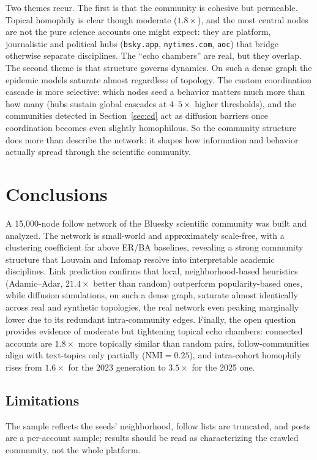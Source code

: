 Two themes recur. The first is that the community is cohesive but permeable. Topical homophily is clear though moderate ($1.8\times$), and the most central nodes are not the pure science accounts one might expect: they are platform, journalistic and political hubs (\texttt{bsky.app}, \texttt{nytimes.com}, \texttt{aoc}) that bridge otherwise separate disciplines. The ``echo chambers'' are real, but they overlap. The second theme is that structure governs dynamics. On such a dense graph the epidemic models saturate almost regardless of topology. The custom coordination cascade is more selective: which nodes seed a behavior matters much more than how many (hubs sustain global cascades at $4$--$5\times$ higher thresholds), and the communities detected in Section~\ref{sec:cd} act as diffusion barriers once coordination becomes even slightly homophilous. So the community structure does more than describe the network: it shapes how information and behavior actually spread through the scientific community.

\section{Conclusions}
A 15{,}000-node follow network of the Bluesky scientific community was built and analyzed. The network is small-world and approximately scale-free, with a clustering coefficient far above ER/BA baselines, revealing a strong community structure that Louvain and Infomap resolve into interpretable academic disciplines. Link prediction confirms that local, neighborhood-based heuristics (Adamic--Adar, $21.4\times$ better than random) outperform popularity-based ones, while diffusion simulations, on such a dense graph, saturate almost identically across real and synthetic topologies, the real network even peaking marginally lower due to its redundant intra-community edges. Finally, the open question provides evidence of moderate but tightening topical echo chambers: connected accounts are $1.8\times$ more topically similar than random pairs, follow-communities align with text-topics only partially ($\mathrm{NMI}=0.25$), and intra-cohort homophily rises from $1.6\times$ for the 2023 generation to $3.5\times$ for the 2025 one.

\subsection{Limitations}
The sample reflects the seeds' neighborhood, follow lists are truncated, and posts are a per-account sample; results should be read as characterizing the crawled community, not the whole platform.
